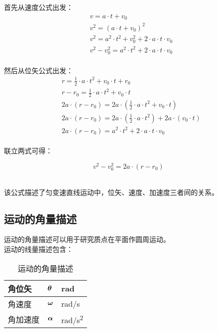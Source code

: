 \documentclass[UTF8]{ctexart}
\newcommand*{\veb}[1]{\vb*{#1}}
\begin{document}
    首先从速度公式出发：
    \begin{align}
        &v=a\cdot t+v_0\\[3mm]
        &v^2=(a\cdot t+v_0)^2\\[3mm]
        &v^2=a^2\cdot t^2+v_0^2+2\cdot a\cdot t\cdot v_0\\[3mm]
        &v^2-v_0^2=a^2\cdot t^2+2\cdot a\cdot t\cdot v_0
    \end{align}\\
    然后从位矢公式出发：
    \begin{align}
        &r=\frac{1}{2}\cdot a\cdot t^2+v_0\cdot t+r_0\\[3mm]
        &r-r_0=\frac{1}{2}\cdot a\cdot t^2+v_0\cdot t\\[3mm]
        &2a\cdot(r-r_0)=2a\cdot\left(\frac{1}{2}\cdot a\cdot t^2+v_0\cdot t\right)\\[3mm]
        &2a\cdot(r-r_0)=2a\cdot\left(\frac{1}{2}\cdot a\cdot t^2\right)+2a\cdot\left(v_0\cdot t\right)\\[3mm]
        &2a\cdot(r-r_0)=a^2\cdot t^2+2\cdot a\cdot t\cdot v_0
    \end{align}\\
    联立两式可得：
    \begin{large}
        \begin{equation*}
            v^2-v_0^2=2a\cdot\left(r-r_0\right)
        \end{equation*}
    \end{large}\\
    该公式描述了匀变速直线运动中，位矢、速度、加速度三者间的关系。

\newpage

\subsection{运动的角量描述}
    运动的角量描述可以用于研究质点在平面作圆周运动。\\[3mm]
    运动的线量描述包含：
    \begin{table}[h]
        \begin{center}
            \begin{tabular}{p{60pt}|p{60 pt}|p{60 pt}}
                \hline
                角位矢&$\veb{\theta}$&\si{rad}\\ \hline
                角速度&$\veb{\omega}$&\si{rad/s}\\ \hline
                角加速度&$\veb{\alpha}$&\si{rad/s^2}\\ \hline
            \end{tabular}
            \caption{运动的角量描述}
        \end{center}
    \end{table}\vspace{-20pt}
\end{document}
